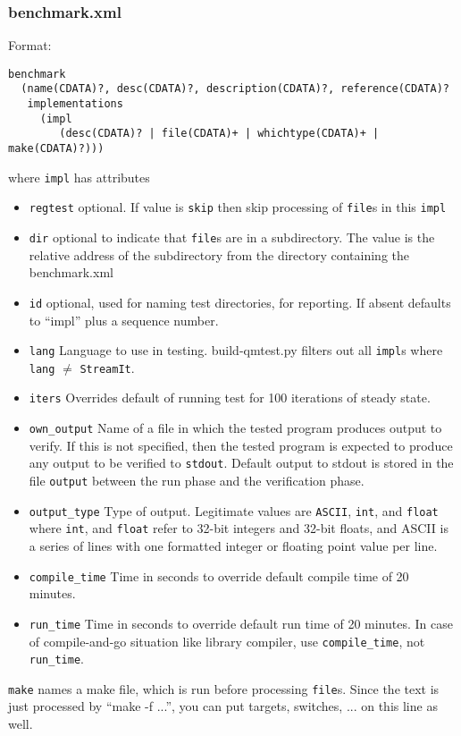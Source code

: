 \documentclass[11pt]{article}
\begin{document}
\subsubsection{benchmark.xml}
Format:\begin{verbatim}
benchmark 
  (name(CDATA)?, desc(CDATA)?, description(CDATA)?, reference(CDATA)?
   implementations 
     (impl
        (desc(CDATA)? | file(CDATA)+ | whichtype(CDATA)+ | make(CDATA)?)))
       \end{verbatim}%
where {\tt impl} has attributes
\begin{itemize}
\item {\tt regtest} optional.  If value is {\tt skip} then skip
  processing of {\tt file}s in this {\tt impl} 
\item {\tt dir} optional to indicate that {\tt file}s are in a subdirectory.
The value is the relative address of the subdirectory from the
directory containing the benchmark.xml
\item {\tt id} optional, used for naming test directories, for
  reporting.  If absent defaults to ``impl'' plus a sequence number.
\item {\tt lang} Language to use in testing.  build-qmtest.py filters
  out all {\tt impl}s where {\tt lang} $\neq$ {\tt StreamIt}.
\item {\tt iters} Overrides default of running test for 100 iterations of steady state.
\item {\tt own\_output} Name of a file in which the tested program produces
output to verify.  If this is not specified, then the tested program is
expected to produce any output to be verified to {\tt stdout}.
Default output to stdout is stored in the file {\tt output} between the run
phase and the verification phase.
\item {\tt output\_type} Type of output.  Legitimate values are {\tt ASCII}, {\tt int}, and {\tt float} where {\tt int}, and {\tt float} refer to 32-bit integers and 32-bit floats, and ASCII is a series of lines with one formatted integer or floating point value per line. 
\item {\tt compile\_time} Time in seconds to override default compile time of 20 minutes.
\item {\tt run\_time} Time in seconds to override default run time of 20 minutes.
In case of compile-and-go situation like library compiler, use {\tt compile\_time}, not {\tt run\_time}.
\end{itemize}

{\tt make} names a make file, which is run before processing {\tt file}s.
Since the text is just processed by ``make -f ...'', you can put targets, 
switches, ... on this line as well.
\end{document}

